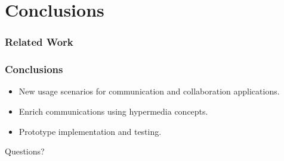 \documentclass[t]{beamer}
\begin{document}
\begin{frame}[c]
\begin{ganttchart}{1}{36}


\end{ganttchart}

	\end{frame}




\section{Conclusions}\label{concl} %
\begin{frame}[t,shrink]
\frametitle{Related Work} 
\end{frame}

\begin{frame}[c]
		\frametitle{Conclusions}
		\begin{itemize}
\item New usage scenarios for communication and collaboration applications.
		\vfill

\item Enrich communications using hypermedia concepts.
		\vfill

\item Prototype implementation and testing.
		\end{itemize}

	\end{frame}






\begin{frame}[c]
\Huge{\centerline{Questions?}}
\end{frame}

\end{document}

